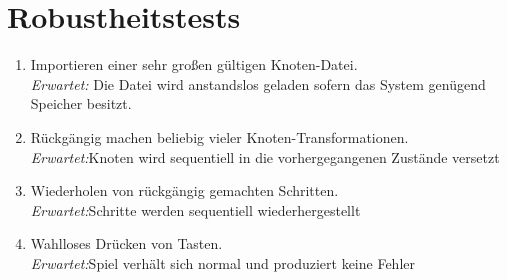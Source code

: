 \section{Robustheitstests}


\begin{enumerate}[resume]
\item Importieren einer sehr großen gültigen Knoten-Datei.\\
\textit{Erwartet:} Die Datei wird anstandslos geladen sofern das System genügend Speicher besitzt.
\item Rückgängig machen beliebig vieler Knoten-Transformationen. \\
\textit{Erwartet:}Knoten wird sequentiell in die vorhergegangenen Zustände versetzt
\item Wiederholen von rückgängig gemachten Schritten.\\
\textit{Erwartet:}Schritte werden sequentiell wiederhergestellt

\item Wahlloses Drücken von Tasten.\\
\textit{Erwartet:}Spiel verhält sich normal und produziert keine Fehler
\end{enumerate}



